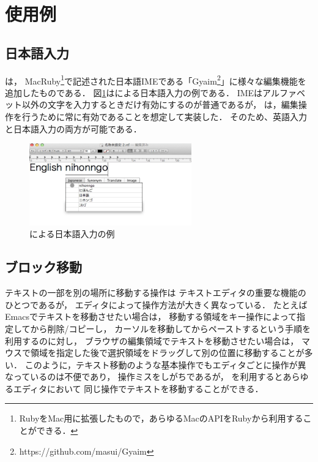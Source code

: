 \section{{\system}使用例}


\subsection{日本語入力}

{\system}は，
MacRuby\footnote{
  RubyをMac用に拡張したもので，あらゆるMacのAPIをRubyから利用することができる．
}で記述された日本語IMEである「Gyaim\footnote{
 \textsf{https://github.com/masui/Gyaim}
}」に様々な編集機能を追加したものである．
%
図\ref{japaneseinput}は{\system}による日本語入力の例である．
IMEはアルファベット以外の文字を入力するときだけ有効にするのが普通であるが，
{\system}は，編集操作を行うために常に有効であることを想定して実装した．
そのため、英語入力と日本語入力の両方が可能である．

\begin{figure}[H]
\centerline{\includegraphics[width=70mm,bb=0 0 600 320]{figures/japanese.png}}
\caption{{\system}による日本語入力の例}
\label{japaneseinput}
\end{figure}

\subsection{ブロック移動}

テキストの一部を別の場所に移動する操作は
テキストエディタの重要な機能のひとつであるが，
エディタによって操作方法が大きく異なっている．
たとえばEmacsでテキストを移動させたい場合は，
移動する領域をキー操作によって指定してから削除/コピーし，
カーソルを移動してからペーストするという手順を利用するのに対し，
ブラウザの編集領域でテキストを移動させたい場合は，
マウスで領域を指定した後で選択領域をドラッグして別の位置に移動することが多い．
このように，テキスト移動のような基本操作でもエディタごとに操作が異なっているのは不便であり，
操作ミスをしがちであるが，
{\system}を利用するとあらゆるエディタにおいて
同じ操作でテキストを移動することができる．


